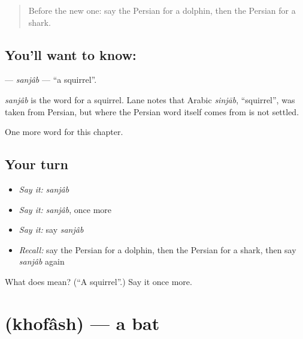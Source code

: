 \label{lesson:FA-C122-sanjab}



\begin{quote}
Before the new one: say the Persian for a dolphin, then the Persian for a shark.
\end{quote}

\subsection*{You'll want to know: }
\textbf{} — \emph{sanjâb} — \textquotedblleft{}a squirrel\textquotedblright{}.

\begin{cousinweb}
\emph{sanjâb} is the word for a squirrel. Lane notes that Arabic \emph{sinjāb}, \textquotedblleft{}squirrel\textquotedblright{}, was taken from Persian, but where the Persian word itself comes from is not settled.
\end{cousinweb}

\begin{grammarlens}[title={What you've built}]
One more word for this chapter.
\end{grammarlens}

\subsection*{Your turn}
\begin{itemize}
\raggedright
  \item \emph{Say it:} \emph{sanjâb}
  \item \emph{Say it:} \emph{sanjâb}, once more
  \item \emph{Say it:} say \emph{sanjâb}
  \item \emph{Recall:} say the Persian for a dolphin, then the Persian for a shark, then say \emph{sanjâb} again
\end{itemize}

\begin{tcolorbox}[breakable,colback=teal!4,colframe=teal!35!black,title={Before you move on}]
What does  mean? (\textquotedblleft{}A squirrel\textquotedblright{}.) Say it once more.
\end{tcolorbox}
\section[\texorpdfstring{\fa{خفاش} (khofâsh)}{خفاش (khofâsh)}]{ (khofâsh) — a bat}

\label{lesson:FA-C122-khofash}



